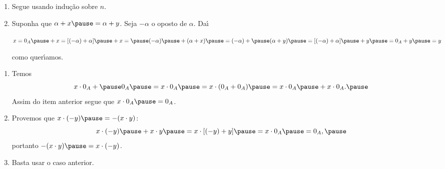 \documentclass{beamer}
\begin{document}
    \begin{frame}
            \begin{enumerate}[label={\roman*})]
                \conti

                \item Segue usando indu\c{c}\~ao sobre $n$.\pause

                \vspace{.5cm}

                \item Suponha que $\alpha + x \pause = \alpha + y$. \pause Seja $-\alpha$ \pause o oposto de $\alpha$. \pause Da{\'\i}\pause
                \begin{center}
                    $x = 0_A \pause + x = [(-\alpha) + \alpha] \pause + x = \pause (-\alpha) \pause + (\alpha + x) \pause = (-\alpha) + \pause (\alpha + y) \pause = [(-\alpha) + \alpha] \pause + y \pause = 0_A + y \pause = y$\pause
                \end{center}
                como quer{\'\i}amos.\pause
            \end{enumerate}
    \end{frame}

    \begin{frame}
            \begin{enumerate}[label={\roman*})]
                \conti
                \item Temos \pause
                \[
                    x\cdot 0_A + \pause 0_A \pause = x\cdot 0_A \pause = x\cdot(0_A + 0_A) \pause = x\cdot 0_A \pause + x\cdot 0_A.\pause
                \]
                Assim do item anterior \pause segue que $x\cdot 0_A \pause = 0_A$.\pause

                \vspace{.5cm}

                \item Provemos que \pause $x \cdot (-y) \pause = -(x \cdot y)$\pause :
                \[
                    x \cdot (-y) \pause + x \cdot y \pause = x \cdot [(-y) + y] \pause = x\cdot 0_A \pause = 0_A,\pause
                \]
                portanto $-(x \cdot y) \pause = x \cdot (-y)$.\pause

                \vspace{.5cm}
                
                \item Basta usar o caso anterior.\pause
            \end{enumerate}
    \end{frame}
\end{document}
